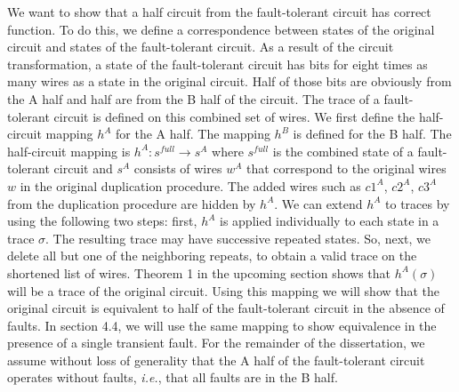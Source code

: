 \documentclass[12pt]{report}
\begin{document}
We want to show that a half circuit from the fault-tolerant circuit has correct function.  To do this, we define a correspondence between states of the original circuit and states of the fault-tolerant circuit.  As a result of the circuit transformation, a state of the fault-tolerant circuit has bits for eight times as many wires as a state in the original circuit.  Half of those bits are obviously from the A half and half are from the B half of the circuit.  The trace of a fault-tolerant circuit is defined on this combined set of wires.  We first define the half-circuit mapping $h^A$ for the A half.  The mapping $h^B$ is defined for the B half.  The half-circuit mapping is $h^A: s^{\textit{full}} \to s^A$ where $s^{\textit{full}}$ is the combined state of a fault-tolerant circuit and $s^A$ consists of wires $w^A$ that correspond to the original wires $w$ in the original duplication procedure.  The added wires such as $c1^A$, $c2^A$, $c3^A$ from the duplication procedure are hidden by $h^A$.  We can extend $h^A$ to traces by using the following two steps: first, $h^A$ is applied individually to each state in a trace $\sigma$.  %
The resulting trace may have successive repeated states.  So, next, we delete all but one of the neighboring repeats, to obtain a valid trace on the shortened list of wires.  Theorem 1 in the upcoming section shows that $h^A(\sigma)$ will be a trace of the original circuit.  
Using this mapping we will show that the original circuit is equivalent to half of the fault-tolerant circuit in the absence of faults.  In section 4.4, we will use the same mapping to show equivalence in the presence of a single transient fault.  For the remainder of the dissertation, we assume without loss of generality that the A half of the fault-tolerant circuit operates without faults, {\em i.e.}, that all faults are in the B half.
\\
\end{document}
